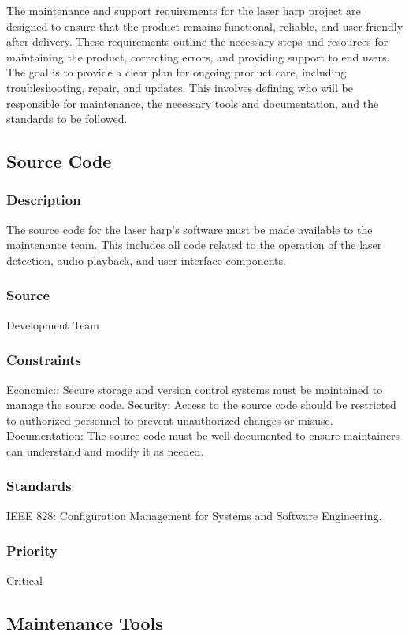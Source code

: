The maintenance and support requirements for the laser harp project are designed to ensure that the product remains functional, reliable, and user-friendly after delivery. These requirements outline the necessary steps and resources for maintaining the product, correcting errors, and providing support to end users. The goal is to provide a clear plan for ongoing product care, including troubleshooting, repair, and updates. This involves defining who will be responsible for maintenance, the necessary tools and documentation, and the standards to be followed.


\subsection{Source Code}
\subsubsection{Description}
The source code for the laser harp's software must be made available to the maintenance team. This includes all code related to the operation of the laser detection, audio playback, and user interface components.
\subsubsection{Source}
Development Team
\subsubsection{Constraints}
Economic:: Secure storage and version control systems must be maintained to manage the source code.
Security: Access to the source code should be restricted to authorized personnel to prevent unauthorized changes or misuse.
Documentation: The source code must be well-documented to ensure maintainers can understand and modify it as needed.
\subsubsection{Standards}
IEEE 828: Configuration Management for Systems and Software Engineering.
\subsubsection{Priority}
Critical


\subsection{Maintenance Tools}
